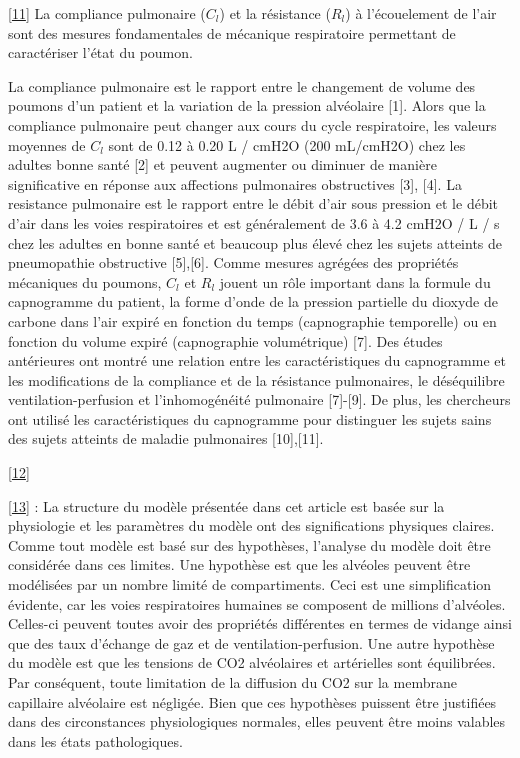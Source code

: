 \documentclass[12pt,]{article}
\begin{document}
{[}\protect\hyperlink{ref-abid2015model}{11}{]} La compliance pulmonaire
(\(C_{l}\)) et la résistance (\(R_{l}\)) à l'écouelement de l'air sont
des mesures fondamentales de mécanique respiratoire permettant de
caractériser l'état du poumon.

La compliance pulmonaire est le rapport entre le changement de volume
des poumons d'un patient et la variation de la pression alvéolaire
{[}1{]}. Alors que la compliance pulmonaire peut changer aux cours du
cycle respiratoire, les valeurs moyennes de \(C_{l}\) sont de 0.12 à
0.20 L / cmH2O (200 mL/cmH2O) chez les adultes bonne santé {[}2{]} et
peuvent augmenter ou diminuer de manière significative en réponse aux
affections pulmonaires obstructives {[}3{]}, {[}4{]}. La resistance
pulmonaire est le rapport entre le débit d'air sous pression et le débit
d'air dans les voies respiratoires et est généralement de 3.6 à 4.2
cmH2O / L / s chez les adultes en bonne santé et beaucoup plus élevé
chez les sujets atteints de pneumopathie obstructive {[}5{]},{[}6{]}.
Comme mesures agrégées des propriétés mécaniques du poumons, \(C_{l}\)
et \(R_{l}\) jouent un rôle important dans la formule du capnogramme du
patient, la forme d'onde de la pression partielle du dioxyde de carbone
dans l'air expiré en fonction du temps (capnographie temporelle) ou en
fonction du volume expiré (capnographie volumétrique) {[}7{]}. Des
études antérieures ont montré une relation entre les caractéristiques du
capnogramme et les modifications de la compliance et de la résistance
pulmonaires, le déséquilibre ventilation-perfusion et l'inhomogénéité
pulmonaire {[}7{]}-{[}9{]}. De plus, les chercheurs ont utilisé les
caractéristiques du capnogramme pour distinguer les sujets sains des
sujets atteints de maladie pulmonaires {[}10{]},{[}11{]}.

{[}\protect\hyperlink{ref-abid2017model}{12}{]}

{[}\protect\hyperlink{ref-roy2007calculating}{13}{]} : La structure du
modèle présentée dans cet article est basée sur la physiologie et les
paramètres du modèle ont des significations physiques claires. Comme
tout modèle est basé sur des hypothèses, l'analyse du modèle doit être
considérée dans ces limites. Une hypothèse est que les alvéoles peuvent
être modélisées par un nombre limité de compartiments. Ceci est une
simplification évidente, car les voies respiratoires humaines se
composent de millions d'alvéoles. Celles-ci peuvent toutes avoir des
propriétés différentes en termes de vidange ainsi que des taux d'échange
de gaz et de ventilation-perfusion. Une autre hypothèse du modèle est
que les tensions de CO2 alvéolaires et artérielles sont équilibrées. Par
conséquent, toute limitation de la diffusion du CO2 sur la membrane
capillaire alvéolaire est négligée. Bien que ces hypothèses puissent
être justifiées dans des circonstances physiologiques normales, elles
peuvent être moins valables dans les états pathologiques.
\end{document}
